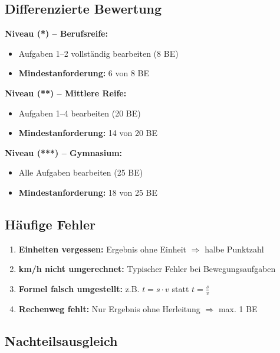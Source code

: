 \documentclass[11pt, a4paper]{article}
\begin{document}
\vspace{1.5em}

\subsection*{Differenzierte Bewertung}

\textbf{Niveau (*) -- Berufsreife:}
\begin{itemize}
    \item Aufgaben 1--2 vollständig bearbeiten (8 BE)
    \item \textbf{Mindestanforderung:} 6 von 8 BE
\end{itemize}

\textbf{Niveau (**) -- Mittlere Reife:}
\begin{itemize}
    \item Aufgaben 1--4 bearbeiten (20 BE)
    \item \textbf{Mindestanforderung:} 14 von 20 BE
\end{itemize}

\textbf{Niveau (***) -- Gymnasium:}
\begin{itemize}
    \item Alle Aufgaben bearbeiten (25 BE)
    \item \textbf{Mindestanforderung:} 18 von 25 BE
\end{itemize}

\vspace{1.5em}

\subsection*{Häufige Fehler}

\begin{enumerate}
    \item \textbf{Einheiten vergessen:} Ergebnis ohne Einheit $\Rightarrow$ halbe Punktzahl
    \item \textbf{km/h nicht umgerechnet:} Typischer Fehler bei Bewegungsaufgaben
    \item \textbf{Formel falsch umgestellt:} z.B. $t = s \cdot v$ statt $t = \frac{s}{v}$
    \item \textbf{Rechenweg fehlt:} Nur Ergebnis ohne Herleitung $\Rightarrow$ max. 1 BE
\end{enumerate}

\vspace{1.5em}

\subsection*{Nachteilsausgleich}
\end{document}
